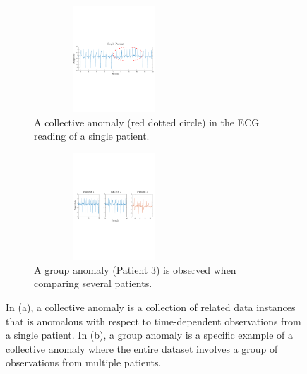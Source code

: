 \begin{figure}[h]
\centering
   \begin{subfigure}{1\linewidth} \centering
     \includegraphics[width=6cm, height=4cm,trim=5cm 9.5cm 4.5cm 9cm]{FIGURES/ECGa}
     \caption{A collective anomaly (red dotted circle) in the ECG reading of a single patient.}
   \end{subfigure}
   \begin{subfigure}{1\linewidth} \centering
     \includegraphics[width=6cm,  height=4cm,trim=5cm 9.5cm 4.5cm 8.5cm]{FIGURES/ECG}
     \caption{A group anomaly (Patient 3) is observed when comparing several patients.} 
   \end{subfigure}
\caption{ In (a), a collective anomaly is a collection of related data instances that is anomalous with respect to time-dependent observations from  a single patient.   
In (b), a group anomaly is a specific example of a collective anomaly where  the entire dataset involves a group of observations from multiple patients. 
 } \label{Fig:ECG}
\end{figure}


 
 

